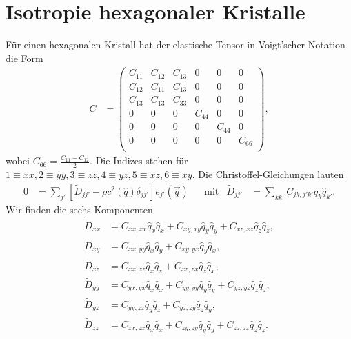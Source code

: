 \documentclass[english, parskip=full]{scrartcl}
\title{\titel}
\author{\autor}
\date{\today}
\newcommand{\klam}{}
\newcommand{\tecxt}{}
\begin{document}
\maketitle  %

\section{Isotropie hexagonaler Kristalle}
Für einen hexagonalen Kristall hat der elastische Tensor in Voigt'scher Notation die Form
\begin{align}
C &= \begin{pmatrix}
C_{11} & C_{12} & C_{13} & 0 & 0 & 0 \\
C_{12} & C_{11} & C_{13} & 0 & 0 & 0 \\
C_{13} & C_{13} & C_{33} & 0 & 0 & 0 \\
0 & 0 & 0 & C_{44} & 0 & 0 \\
0 & 0 & 0 & 0 & C_{44} & 0 \\
0 & 0 & 0 & 0 & 0 & C_{66} \\
\end{pmatrix},
\end{align}
wobei $C_{66} = \frac{C_{11} - C_{12}}{2}$.
Die Indizes stehen für $1\equiv xx, 2\equiv yy, 3\equiv zz, 4\equiv yz, 5\equiv xz, 6\equiv xy$.
Die Christoffel-Gleichungen lauten
\begin{align}
0 &= \sum_{j'} \klam\left[ \tilde{D}_{jj'} - \rho c^2(\hat{q})\delta_{jj'} \right]e_{j'}(\vec{q}) && \tecxt\text{mit} & \tilde{D}_{jj'} &= \sum_{kk'} C_{jk,j'k'} \hat{q}_k \hat{q}_{k'}. 
\end{align}
Wir finden die sechs Komponenten
\begin{align}
\tilde{D}_{xx} &= C_{xx,xx}\hat{q}_x\hat{q}_x + C_{xy,xy}\hat{q}_y\hat{q}_y + C_{xz,xz}\hat{q}_z\hat{q}_z,\\
\tilde{D}_{xy} &= C_{xx,yy}\hat{q}_x\hat{q}_y + C_{xy,yx}\hat{q}_y\hat{q}_x,\\
\tilde{D}_{xz} &= C_{xx,zz}\hat{q}_x\hat{q}_z + C_{xz,zx}\hat{q}_z\hat{q}_x,\\
\tilde{D}_{yy} &= C_{yx,yx}\hat{q}_x\hat{q}_x + C_{yy,yy}\hat{q}_y\hat{q}_y + C_{yz,yz}\hat{q}_z\hat{q}_z,\\
\tilde{D}_{yz} &= C_{yy,zz}\hat{q}_y\hat{q}_z + C_{yz,zy}\hat{q}_z\hat{q}_y,\\
\tilde{D}_{zz} &= C_{zx,zx}\hat{q}_x\hat{q}_x + C_{zy,zy}\hat{q}_y\hat{q}_y + C_{zz,zz}\hat{q}_z\hat{q}_z.
\end{align}
\end{document}
